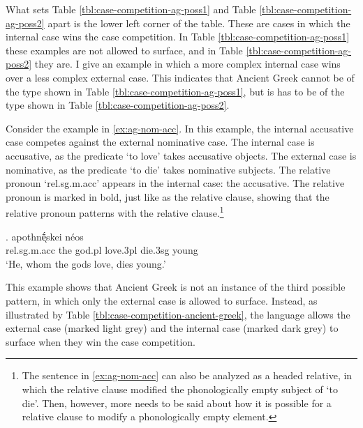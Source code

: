 What sets Table \ref{tbl:case-competition-ag-poss1} and Table \ref{tbl:case-competition-ag-poss2} apart is the lower left corner of the table. These are cases in which the internal case wins the case competition.
In Table \ref{tbl:case-competition-ag-poss1} these examples are not allowed to surface, and in Table \ref{tbl:case-competition-ag-poss2} they are.
I give an example in which a more complex internal case wins over a less complex external case. This indicates that Ancient Greek cannot be of the type shown in Table \ref{tbl:case-competition-ag-poss1}, but is has to be of the type shown in Table \ref{tbl:case-competition-ag-poss2}.

Consider the example in \ref{ex:ag-nom-acc}. In this example, the internal accusative case competes against the external nominative case.
The internal case is accusative, as the predicate  `to love' takes accusative objects.
The external case is nominative, as the predicate  `to die' takes nominative subjects.
The relative pronoun  `\ac{rel}.\ac{sg}.\ac{m}.\ac{acc}' appears in the internal case: the accusative. The relative pronoun is marked in bold, just like as the relative clause, showing that the relative pronoun patterns with the relative clause.\footnote{
The sentence in \ref{ex:ag-nom-acc} can also be analyzed as a headed relative, in which the relative clause modified the phonologically empty subject of  `to die'. Then, however, more needs to be said about how it is possible for a relative clause to modify a phonologically empty element.
}

\exg.     apothnḗͅskei néos\\
\ac{rel}.\ac{sg}.\ac{m}.\ac{acc} the god.\ac{pl} love.3\ac{pl} die.3\ac{sg} young\\
`He, whom the gods love, dies young.' \label{ex:ag-nom-acc}

This example shows that Ancient Greek is not an instance of the third possible pattern, in which only the external case is allowed to surface. Instead, as illustrated by Table \ref{tbl:case-competition-ancient-greek}, the language allows the external case (marked light grey) and the internal case (marked dark grey) to surface when they win the case competition.

